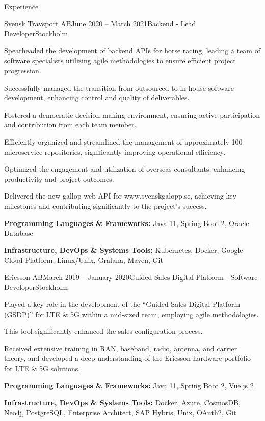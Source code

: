 \documentclass{resume}
\begin{document}
\begin{rSection}{Experience}
    \begin{rSubsection}{Svensk Travsport AB}{June 2020 -- March 2021}{Backend - Lead Developer}{Stockholm}
      \item Spearheaded the development of backend APIs for horse racing, leading a team of software specialists utilizing agile methodologies to ensure efficient project progression.
      \item Successfully managed the transition from outsourced to in-house software development, enhancing control and quality of deliverables.
      \item Fostered a democratic decision-making environment, ensuring active participation and contribution from each team member.
      \item Efficiently organized and streamlined the management of approximately 100 microservice repositories, significantly improving operational efficiency.
      \item Optimized the engagement and utilization of overseas consultants, enhancing productivity and project outcomes.
      \item Delivered the new gallop web API for www.svenskgalopp.se, achieving key milestones and contributing significantly to the project's success.
      \item \textbf{Programming Languages \& Frameworks:} Java 11, Spring Boot 2, Oracle Database
      \item \textbf{Infrastructure, DevOps \& Systems Tools:} Kubernetes, Docker, Google Cloud Platform, Linux/Unix, Grafana, Maven, Git
    \end{rSubsection}

    \pagebreak

    \begin{rSubsection}{Ericsson AB}{March 2019 -- January 2020}{Guided Sales Digital Platform - Software Developer}{Stockholm}
      \item Played a key role in the development of the ``Guided Sales Digital Platform (GSDP)'' for LTE \& 5G within a mid-sized team, employing agile methodologies.
      \item This tool significantly enhanced the sales configuration process.
      \item Received extensive training in RAN, baseband, radio, antenna, and carrier theory, and developed a deep understanding of the Ericsson hardware portfolio for LTE \& 5G solutions.
      \item \textbf{Programming Languages \& Frameworks:} Java 11, Spring Boot 2, Vue.js 2
      \item \textbf{Infrastructure, DevOps \& Systems Tools:} Docker, Azure, CosmosDB, Neo4j, PostgreSQL, Enterprise Architect, SAP Hybris, Unix, OAuth2, Git
    \end{rSubsection}


\end{rSection}
\end{document}
